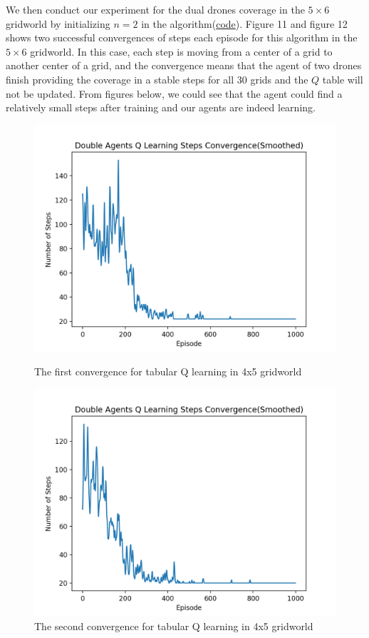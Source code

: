 \documentclass{article}
\begin{document}
We then conduct our experiment for the dual drones coverage in the $5\times6$ gridworld by initializing $n=2$ in the algorithm(\href{https://github.com/zcczhang/UAV_Coverage/tree/master/multi_agent_Q_Learning}{code}). Figure 11 and figure 12 shows two successful convergences of steps each episode for this algorithm in the $5\times6$ gridworld. In this case, each step is moving from a center of a grid to another center of a grid, and the convergence means that the agent of two drones finish providing the coverage in a stable steps for all 30 grids and the $Q$ table will not be updated. From figures below, we could see that the agent could find a relatively small steps after training and our agents are indeed learning.

\begin{figure}[H]
   \begin{minipage}{0.49\textwidth}
     \centering
     \includegraphics[width=.9\linewidth]{15.png}
     \caption{The first convergence for tabular Q learning in 4x5 gridworld}\label{Fig:Data1}
   \end{minipage}\hfill
   \begin{minipage}{0.49\textwidth}
     \centering
     \includegraphics[width=.9\linewidth]{16.png}
     \caption{The second convergence for tabular Q learning in 4x5 gridworld}\label{Fig:Data2}
   \end{minipage}
\end{figure}
\end{document}
